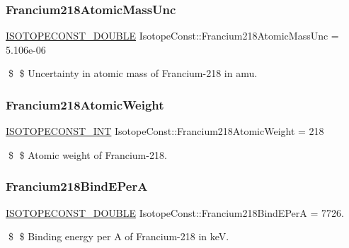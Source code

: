 \subsubsection{\texorpdfstring{Francium218\+Atomic\+Mass\+Unc}{Francium218AtomicMassUnc}}
{\footnotesize\ttfamily \mbox{\hyperlink{group___isotope_const-_macros_ga8f45a7272ce02c0b4c65c44636ed719a}{I\+S\+O\+T\+O\+P\+E\+C\+O\+N\+S\+T\+\_\+\+D\+O\+U\+B\+LE}} Isotope\+Const\+::\+Francium218\+Atomic\+Mass\+Unc = 5.\+106e-\/06}

\$ \$ Uncertainty in atomic mass of Francium-\/218 in amu. \mbox{\label{group___isotope_const-_francium-_fr218_ga05dc946745aa98a440920b40cefcd539}} 
\subsubsection{\texorpdfstring{Francium218\+Atomic\+Weight}{Francium218AtomicWeight}}
{\footnotesize\ttfamily \mbox{\hyperlink{group___isotope_const-_macros_ga5f18360b3e99483a35c32d789e62621c}{I\+S\+O\+T\+O\+P\+E\+C\+O\+N\+S\+T\+\_\+\+I\+NT}} Isotope\+Const\+::\+Francium218\+Atomic\+Weight = 218}

\$ \$ Atomic weight of Francium-\/218. \mbox{\label{group___isotope_const-_francium-_fr218_ga2113b4d9cf119500ddb183d531897a3a}} 
\subsubsection{\texorpdfstring{Francium218\+Bind\+E\+PerA}{Francium218BindEPerA}}
{\footnotesize\ttfamily \mbox{\hyperlink{group___isotope_const-_macros_ga8f45a7272ce02c0b4c65c44636ed719a}{I\+S\+O\+T\+O\+P\+E\+C\+O\+N\+S\+T\+\_\+\+D\+O\+U\+B\+LE}} Isotope\+Const\+::\+Francium218\+Bind\+E\+PerA = 7726.}

\$ \$ Binding energy per A of Francium-\/218 in keV. \mbox{\label{group___isotope_const-_francium-_fr218_gac038268b308f19a73abe33be8b0b8855}} 
